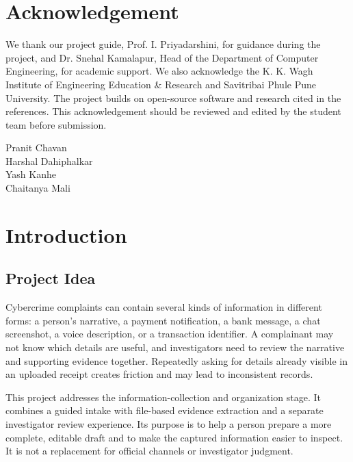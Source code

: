 \documentclass[12pt,a4paper,oneside]{report}
\begin{document}
\clearpage\chapter*{Acknowledgement}

We thank our project guide, Prof. I. Priyadarshini, for guidance during the project, and Dr. Snehal Kamalapur, Head of the Department of Computer Engineering, for academic support. We also acknowledge the K. K. Wagh Institute of Engineering Education \& Research and Savitribai Phule Pune University. The project builds on open-source software and research cited in the references. This acknowledgement should be reviewed and edited by the student team before submission.\par\medskip

\vfill\begin{flushright}Pranit Chavan\\Harshal Dahiphalkar\\Yash Kanhe\\Chaitanya Mali\end{flushright}

\clearpage\tableofcontents

\clearpage{}\listoffigures

\clearpage{}\listoftables

\clearpage{}\pagestyle{main}


\clearpage\chapter{Introduction}
\section{Project Idea}
Cybercrime complaints can contain several kinds of information in different forms: a person's narrative, a payment notification, a bank message, a chat screenshot, a voice description, or a transaction identifier. A complainant may not know which details are useful, and investigators need to review the narrative and supporting evidence together. Repeatedly asking for details already visible in an uploaded receipt creates friction and may lead to inconsistent records.\par\medskip
This project addresses the information-collection and organization stage. It combines a guided intake with file-based evidence extraction and a separate investigator review experience. Its purpose is to help a person prepare a more complete, editable draft and to make the captured information easier to inspect. It is not a replacement for official channels or investigator judgment.\par\medskip
\end{document}

